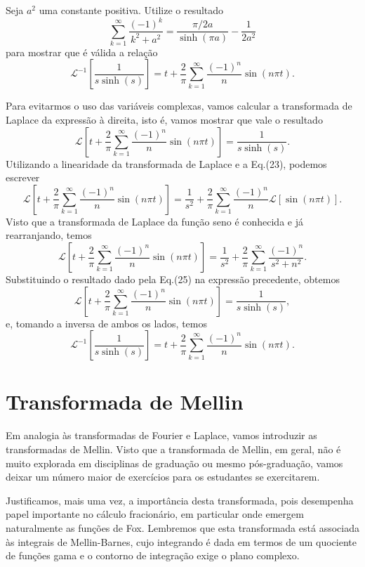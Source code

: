 Seja $a^{2}$ uma constante positiva. Utilize o resultado
\begin{equation}\label{eq:aula04.25}
\sum_{k=1}^{\infty}
\dfrac{(-1)^{k}}{k^{2} + a^{2}}
=
\dfrac{\pi /2a}{\sinh(\pi a)}
-
\dfrac{1}{2a^{2}}
\end{equation}
para mostrar que é válida a relação
$$
\mathscr{L}^{-1}
\left[
\dfrac{1}{s \sinh(s)}
\right]
= t +
\dfrac{2}{\pi}
\sum_{k=1}^{\infty}
\dfrac{(-1)^{n}}{n}
\sin(n\pi t).$$

Para evitarmos o uso das variáveis complexas, vamos calcular a transformada de Laplace da expressão à direita, isto é, vamos mostrar que vale o resultado
$$\mathscr{L}
\left[
t +
\dfrac{2}{\pi}
\sum_{k=1}^{\infty}
\dfrac{(-1)^{n}}{n}
\sin(n\pi t)
\right]
=
\dfrac{1}{s \sinh(s)}.
$$
Utilizando a linearidade da transformada de Laplace e a Eq.(23), podemos escrever
$$\mathscr{L}
\left[
t +
\dfrac{2}{\pi}
\sum_{k=1}^{\infty}
\dfrac{(-1)^{n}}{n}
\sin(n\pi t)
\right]
=
\dfrac{1}{s^{2}}
+
\dfrac{2}{\pi}
\sum_{k=1}^{\infty}
\dfrac{(-1)^{n}}{n}
\mathscr{L}[\sin(n\pi t)].$$
Visto que a transformada de Laplace da função seno é conhecida e já rearranjando, temos
$$
\mathscr{L}
\left[
t +
\dfrac{2}{\pi}
\sum_{k=1}^{\infty}
\dfrac{(-1)^{n}}{n}
\sin(n\pi t)
\right]
=
\dfrac{1}{s^{2}}
+
\dfrac{2}{\pi}
\sum_{k=1}^{\infty}
\dfrac{(-1)^{n}}{s^{2} + n^{2}}.
$$
Substituindo o resultado dado pela Eq.(25) na expressão precedente, obtemos
$$
\mathscr{L}
\left[
t +
\dfrac{2}{\pi}
\sum_{k=1}^{\infty}
\dfrac{(-1)^{n}}{n}
\sin(n\pi t)
\right]
=
\dfrac{1}{s \sinh(s)},$$
e, tomando a inversa de ambos os lados, temos
$$
\mathscr{L}^{-1}
\left[
\dfrac{1}{s \sinh(s)}
\right]
= t +
\dfrac{2}{\pi}
\sum_{k=1}^{\infty}
\dfrac{(-1)^{n}}{n}
\sin(n\pi t).
$$

\section{Transformada de Mellin}

Em analogia às transformadas de Fourier e Laplace, vamos introduzir as transformadas de Mellin. Visto que a transformada de Mellin, em geral, não é muito explorada em disciplinas de graduação ou mesmo pós-graduação, vamos deixar um número maior de exercícios para os estudantes se exercitarem.

Justificamos, mais uma vez, a importância desta transformada, pois desempenha papel importante no cálculo fracionário, em particular onde emergem naturalmente as funções de Fox. Lembremos que esta transformada está associada às integrais de Mellin-Barnes, cujo integrando é dada em termos de um quociente de funções gama e o contorno de integração exige o plano complexo.

